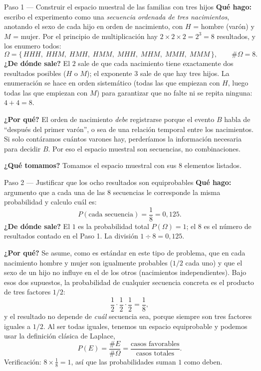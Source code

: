 \documentclass[11pt]{article}
\begin{document}
\begin{sol}
\begin{paso}{Paso 1 --- Construir el espacio muestral de las familias con tres hijos}
\textbf{Qué hago:} escribo el experimento como una \emph{secuencia ordenada de tres
nacimientos}, anotando el sexo de cada hijo en orden de nacimiento, con $H$ = hombre (varón)
y $M$ = mujer. Por el principio de multiplicación hay $2\times2\times2=2^{3}=8$ resultados, y
los enumero todos:
\[
\Omega=\{\,HHH,\;HHM,\;HMH,\;HMM,\;MHH,\;MHM,\;MMH,\;MMM\,\},\qquad \#\Omega=8 .
\]
\textbf{¿De dónde sale?} El $2$ sale de que cada nacimiento tiene exactamente dos resultados
posibles ($H$ o $M$); el exponente $3$ sale de que hay tres hijos. La enumeración se hace en
orden sistemático (todas las que empiezan con $H$, luego todas las que empiezan con $M$) para
garantizar que no falte ni se repita ninguna: $4+4=8$.

\textbf{¿Por qué?} El orden de nacimiento \emph{debe} registrarse porque el evento $B$ habla
de ``después del primer varón'', o sea de una relación temporal entre los nacimientos. Si
solo contáramos cuántos varones hay, perderíamos la información necesaria para decidir $B$.
Por eso el espacio muestral son secuencias, no combinaciones.

\textbf{¿Qué tomamos?} Tomamos el espacio muestral con sus $8$ elementos listados.
\end{paso}

\begin{paso}{Paso 2 --- Justificar que los ocho resultados son equiprobables}
\textbf{Qué hago:} argumento que a cada una de las $8$ secuencias le corresponde la misma
probabilidad y calculo cuál es:
\[
P(\text{cada secuencia})=\frac{1}{8}=0{,}125 .
\]
\textbf{¿De dónde sale?} El $1$ es la probabilidad total $P(\Omega)=1$; el $8$ es el número
de resultados contado en el Paso 1. La división $1\div 8=0{,}125$.

\textbf{¿Por qué?} Se asume, como es estándar en este tipo de problema, que en cada
nacimiento hombre y mujer son igualmente probables ($1/2$ cada uno) y que el sexo de un hijo
no influye en el de los otros (nacimientos independientes). Bajo esos dos supuestos, la
probabilidad de cualquier secuencia concreta es el producto de tres factores $1/2$:
\[
\frac12\cdot\frac12\cdot\frac12=\frac{1}{8},
\]
y el resultado no depende de \emph{cuál} secuencia sea, porque siempre son tres factores
iguales a $1/2$. Al ser todas iguales, tenemos un espacio equiprobable y podemos usar la
definición clásica de Laplace,
\[
P(E)=\frac{\#E}{\#\Omega}=\frac{\text{casos favorables}}{\text{casos totales}} .
\]
Verificación: $8\times\frac18=1$, así que las probabilidades suman $1$ como deben.


\end{paso}
\end{sol}
\end{document}
